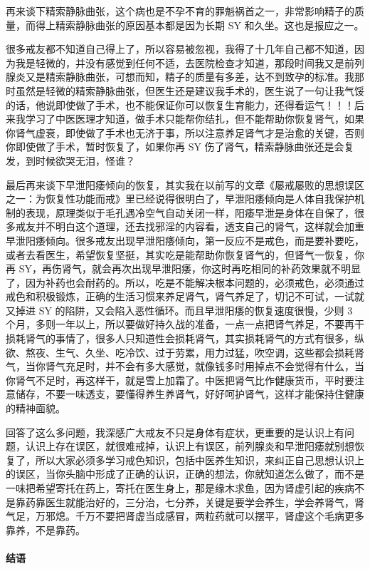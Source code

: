\documentclass[fontset=founder]{ctexart}
\begin{document}
再来谈下精索静脉曲张，这个病也是不孕不育的罪魁祸首之一，非常影响精子的质量，而得上精索静脉曲张的原因基本都是因为长期 SY 和久坐。这也是报应之一。

很多戒友都不知道自己得上了，所以容易被忽视，我得了十几年自己都不知道，因为我是轻微的，并没有感觉到任何不适，去医院检查才知道，那段时间我又是前列腺炎又是精索静脉曲张，可想而知，精子的质量有多差，达不到致孕的标准。我那时虽然是轻微的精索静脉曲张，但医生还是建议我手术的，医生说了一句让我气馁的话，他说即使做了手术，也不能保证你可以恢复生育能力，还得看运气！！！后来我学习了中医医理才知道，做手术只能帮你结扎，但不能帮助你恢复肾气，如果你肾气虚衰，即使做了手术也无济于事，所以注意养足肾气才是治愈的关键，否则你即使做了手术，暂时恢复了，如果你再 SY 伤了肾气，精索静脉曲张还是会复发，到时候欲哭无泪，怪谁？

最后再来谈下早泄阳痿倾向的恢复，其实我在以前写的文章《屡戒屡败的思想误区之一：为恢复性功能而戒》里已经说得很明白了，早泄阳痿倾向是人体自我保护机制的表现，原理类似于毛孔遇冷空气自动关闭一样，阳痿早泄是身体在自保了，很多戒友并不明白这个道理，还去找邪淫的内容看，透支自己的肾气，这样就会加重早泄阳痿倾向。很多戒友出现早泄阳痿倾向，第一反应不是戒色，而是要补要吃，或者去看医生，希望恢复坚挺，其实吃是能帮助你恢复肾气的，但肾气一恢复，你再 SY，再伤肾气，就会再次出现早泄阳痿，你这时再吃相同的补药效果就不明显了，因为补药也会耐药的。所以，吃是不能解决根本问题的，必须戒色，必须通过戒色和积极锻炼，正确的生活习惯来养足肾气，肾气养足了，切记不可试，一试就又掉进 SY 的陷阱，又会陷入恶性循环。而且早泄阳痿的恢复速度很慢，少则 3 个月，多则一年以上，所以要做好持久战的准备，一点一点把肾气养足，不要再干损耗肾气的事情了，很多人只知道性会损耗肾气，其实损耗肾气的方式有很多，纵欲、熬夜、生气、久坐、吃冷饮、过于劳累，用力过猛，吹空调，这些都会损耗肾气，当你肾气充足时，并不会有多大感觉，就像钱多时用掉点不会觉得有什么，当你肾气不足时，再这样干，就是雪上加霜了。中医把肾气比作健康货币，平时要注意储存，不要一味透支，要懂得养生养肾气，好好呵护肾气，这样才能保持住健康的精神面貌。

回答了这么多问题，我深感广大戒友不只是身体有症状，更重要的是认识上有问题，认识上存在误区，就很难戒掉，认识上有误区，前列腺炎和早泄阳痿就别想恢复了，所以大家必须多学习戒色知识，包括中医养生知识，来纠正自己思想认识上的误区，当你头脑中形成了正确的认识，正确的想法，你就知道怎么做了，而不是一味把希望寄托在药上，寄托在医生身上，那是缘木求鱼，因为肾虚引起的疾病不是靠药靠医生就能治好的，三分治，七分养，关键是要学会养生，学会养肾气，肾气足，万邪熄。千万不要把肾虚当成感冒，两粒药就可以摆平，肾虚这个毛病更多靠养，不是靠药。

\paragraph{结语}
\end{document}
